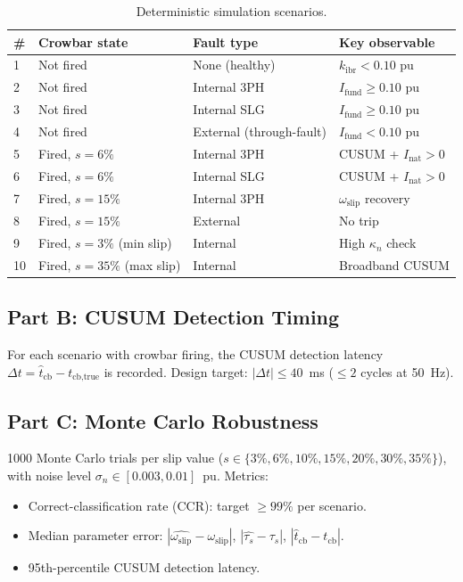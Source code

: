 \documentclass[11pt,a4paper]{article}
\newcommand{\omegas}{\omega_{\text{slip}}}
\newcommand{\taus}{\tau_s}
\newcommand{\tcb}{t_{\text{cb}}}
\begin{document}
\begin{table}[ht]
  \centering
  \caption{Deterministic simulation scenarios.}
  \label{tab:scenarios}
  \begin{tabular}{llll}
    \toprule
    \# & Crowbar state & Fault type & Key observable \\
    \midrule
    1 & Not fired   & None (healthy)         & $k_{\text{ibr}}<0.10$ pu \\
    2 & Not fired   & Internal 3PH           & $I_{\text{fund}} \geq 0.10$ pu \\
    3 & Not fired   & Internal SLG           & $I_{\text{fund}} \geq 0.10$ pu \\
    4 & Not fired   & External (through-fault) & $I_{\text{fund}} < 0.10$ pu \\
    5 & Fired, $s=6\%$ & Internal 3PH       & CUSUM + $I_{\text{nat}}>0$ \\
    6 & Fired, $s=6\%$ & Internal SLG       & CUSUM + $I_{\text{nat}}>0$ \\
    7 & Fired, $s=15\%$ & Internal 3PH      & $\omegas$ recovery \\
    8 & Fired, $s=15\%$ & External           & No trip \\
    9 & Fired, $s=3\%$ (min slip) & Internal & High $\kappa_n$ check \\
    10& Fired, $s=35\%$ (max slip) & Internal & Broadband CUSUM \\
    \bottomrule
  \end{tabular}
\end{table}

\subsection{Part B: CUSUM Detection Timing}

For each scenario with crowbar firing, the CUSUM detection latency
$\Delta t = \hat{t}_{\text{cb}} - t_{\text{cb,true}}$ is recorded.
Design target: $|\Delta t| \leq 40$~ms ($\leq 2$ cycles at 50~Hz).

\subsection{Part C: Monte Carlo Robustness}

1000 Monte Carlo trials per slip value ($s\in\{3\%, 6\%, 10\%, 15\%, 20\%,
30\%, 35\%\}$), with noise level $\sigma_n\in[0.003, 0.01]$~pu.
Metrics:
\begin{itemize}
  \item Correct-classification rate (CCR): target $\geq 99\%$ per scenario.
  \item Median parameter error: $|\hat{\omegas} - \omegas|$,
        $|\hat{\taus} - \taus|$, $|\hat{t}_{\text{cb}} - \tcb|$.
  \item 95th-percentile CUSUM detection latency.
\end{itemize}
\end{document}
